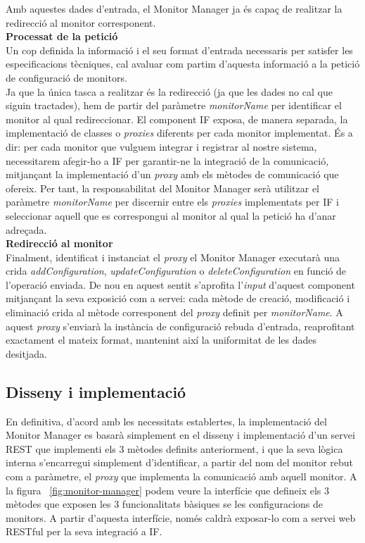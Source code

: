 Amb aquestes dades d'entrada, el Monitor Manager ja és capaç de realitzar la redirecció al monitor corresponent.\\

\noindent \textbf{\large Processat de la petició}\\

\noindent Un cop definida la informació i el seu format d'entrada necessaris per satisfer les especificacions tècniques, cal avaluar com partim d'aquesta informació a la petició de configuració de monitors.\\

Ja que la única tasca a realitzar és la redirecció (ja que les dades no cal que siguin tractades), hem de partir del paràmetre \textit{monitorName} per identificar el monitor al qual redireccionar. El component IF exposa, de manera separada, la implementació de classes o \textit{proxies} diferents per cada monitor implementat. És a dir: per cada monitor que vulguem integrar i registrar al nostre sistema, necessitarem afegir-ho a IF per garantir-ne la integració de la comunicació, mitjançant la implementació d'un \textit{proxy} amb els mètodes de comunicació que ofereix. Per tant, la responsabilitat del Monitor Manager serà utilitzar el paràmetre \textit{monitorName} per discernir entre els \textit{proxies} implementats per IF i seleccionar aquell que es correspongui al monitor al qual la petició ha d'anar adreçada. \\

\noindent \textbf{\large Redirecció al monitor}\\

\noindent Finalment, identificat i instanciat el \textit{proxy} el Monitor Manager executarà una crida \textit{addConfiguration}, \textit{updateConfiguration} o \textit{deleteConfiguration} en funció de l'operació enviada. De nou en aquest sentit s'aprofita l'\textit{input} d'aquest component mitjançant la seva exposició com a servei: cada mètode de creació, modificació i eliminació crida al mètode corresponent del \textit{proxy} definit per \textit{monitorName}. A aquest \textit{proxy} s'enviarà la instància de configuració rebuda d'entrada, reaprofitant exactament el mateix format, mantenint així la uniformitat de les dades desitjada.

\subsection{Disseny i implementació}

En definitiva, d'acord amb les necessitats establertes, la implementació del Monitor Manager es basarà simplement en el disseny i implementació d'un servei REST que implementi els 3 mètodes definits anteriorment, i que la seva lògica interna s'encarregui simplement d'identificar, a partir del nom del monitor rebut com a paràmetre, el \textit{proxy} que implementa la comunicació amb aquell monitor. A la figura ~\ref{fig:monitor-manager} podem veure la interfície que defineix els 3 mètodes que exposen les 3 funcionalitats bàsiques se les configuracions de monitors. A partir d'aquesta interfície, només caldrà exposar-lo com a servei web RESTful per la seva integració a IF.\\

